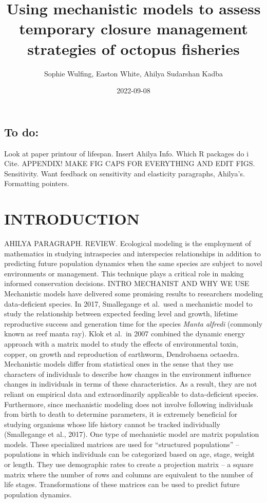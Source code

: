 \documentclass[
]{article}
\title{Using mechanistic models to assess temporary closure management strategies of octopus fisheries}
\author{Sophie Wulfing, Easton White, Ahilya Sudarshan Kadba}
\date{2022-09-08}
\begin{document}
\maketitle

\hypertarget{to-do}{%
\subsection{To do:}\label{to-do}}

Look at paper printour of lifespan.
Insert Ahilya Info.
Which R packages do i Cite.
APPENDIX!
MAKE FIG CAPS FOR EVERYTHING AND EDIT FIGS.
Sensitivity.
Want feedback on sensitivity and elasticity paragraphs, Ahilya's. Formatting pointers.

\hypertarget{introduction}{%
\section{INTRODUCTION}\label{introduction}}

AHILYA PARAGRAPH. REVIEW. Ecological modeling is the employment of mathematics in studying intraspecies and interspecies relationships in addition to predicting future population dynamics when the same species are subject to novel environments or management. This technique plays a critical role in making informed conservation decisions. INTRO MECHANIST AND WHY WE USE Mechanistic models have delivered some promising results to researchers modeling data-deficient species. In 2017, Smallegange et al.~used a mechanistic model to study the relationship between expected feeding level and growth, lifetime reproductive success and generation time for the species \emph{Manta alfredi} (commonly known as reef manta ray). Klok et al.~in 2007 combined the dynamic energy approach with a matrix model to study the effects of environmental toxin, copper, on growth and reproduction of earthworm, Dendrobaena octaedra. Mechanistic models differ from statistical ones in the sense that they use characters of individuals to describe how changes in the environment influence changes in individuals in terms of these characteristics. As a result, they are not reliant on empirical data and extraordinarily applicable to data-deficient species. Furthermore, since mechanistic modeling does not involve following individuals from birth to death to determine parameters, it is extremely beneficial for studying organisms whose life history cannot be tracked individually (Smallegange et al., 2017). One type of mechanistic model are matrix population models. These specialized matrices are used for ``structured populations'' -- populations in which individuals can be categorized based on age, stage, weight or length. They use demographic rates to create a projection matrix -- a square matrix where the number of rows and columns are equivalent to the number of life stages. Transformations of these matrices can be used to predict future population dynamics.
\end{document}
